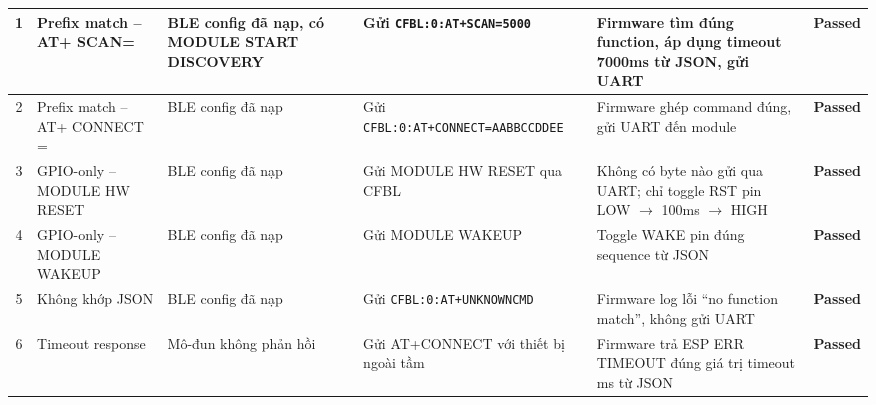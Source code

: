 \begin{longtable}{|c|p{2cm}|p{2.5cm}|p{3.5cm}|p{4cm}|c|}
            1 & Prefix match -- AT+ \newline SCAN= & BLE config đã nạp, có MODULE START DISCOVERY & Gửi \texttt{CFBL:0:}\newline\texttt{AT+SCAN=5000} & Firmware tìm đúng function, áp dụng timeout 7000ms từ JSON, gửi UART & \textcolor{modern_blue}{\textbf{Passed}} \\ \hline
            2 & Prefix match -- AT+ \newline CONNECT \newline = & BLE config đã nạp & Gửi \texttt{CFBL:0:}\newline\texttt{AT+CONNECT=}\newline\texttt{AABBCCDDEE} & Firmware ghép command đúng, gửi UART đến module & \textcolor{modern_blue}{\textbf{Passed}} \\ \hline
            3 & GPIO-only -- MODULE HW RESET & BLE config đã nạp & Gửi MODULE HW RESET qua CFBL & Không có byte nào gửi qua UART; chỉ toggle RST pin LOW $\rightarrow$ 100ms $\rightarrow$ HIGH & \textcolor{modern_blue}{\textbf{Passed}} \\ \hline
            4 & GPIO-only -- MODULE WAKEUP & BLE config đã nạp & Gửi MODULE WAKEUP & Toggle WAKE pin đúng sequence từ JSON & \textcolor{modern_blue}{\textbf{Passed}} \\ \hline
            5 & Không khớp JSON & BLE config đã nạp & Gửi \texttt{CFBL:0:}\newline\texttt{AT+UNKNOWNCMD} & Firmware log lỗi ``no function match'', không gửi UART & \textcolor{modern_blue}{\textbf{Passed}} \\ \hline
            6 & Timeout response & Mô-đun không phản hồi & Gửi AT+CONNECT với thiết bị ngoài tầm & Firmware trả ESP ERR TIMEOUT đúng giá trị timeout ms từ JSON & \textcolor{modern_blue}{\textbf{Passed}} \\ \hline
        \end{longtable}
        
